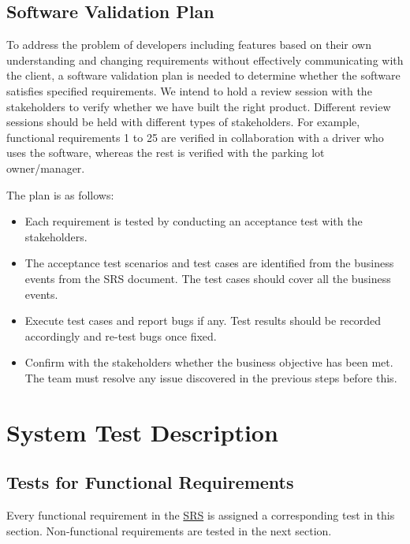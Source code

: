 \documentclass[12pt, titlepage]{article}
\begin{document}
\subsection{Software Validation Plan}
\label{sec:validation}

To address the problem of developers including features based on their own
understanding and changing requirements without effectively communicating with
the client, a software validation plan is needed to determine whether the
software satisfies specified requirements. We intend to hold a review session
with the stakeholders to verify whether we have built the right product.
Different review sessions should be held with different types of stakeholders.
For example, functional requirements 1 to 25 are verified in collaboration with
a driver who uses the software, whereas the rest is verified with the parking
lot owner/manager.

The plan is as follows: 
\begin{itemize}
    \item Each requirement is tested by conducting an acceptance test with the
    stakeholders. 
    \item The acceptance test scenarios and test cases are identified from the
    business events from the SRS document. The test cases should cover all the
    business events.
    \item Execute test cases and report bugs if any. Test results should be
    recorded accordingly and re-test bugs once fixed.
    \item Confirm with the stakeholders whether the business objective has been
    met. The team must resolve any issue discovered in the previous steps before
    this.
\end{itemize}


\section{System Test Description}
	
\subsection{Tests for Functional Requirements}
\label{sec:5.1}
Every functional requirement in the
\href{https://github.com/parkd-app/park-d/blob/main/docs/SRS/SRS.pdf}{SRS} is
assigned a corresponding test in this section. Non-functional requirements are
tested in the next section.

		
\end{document}
